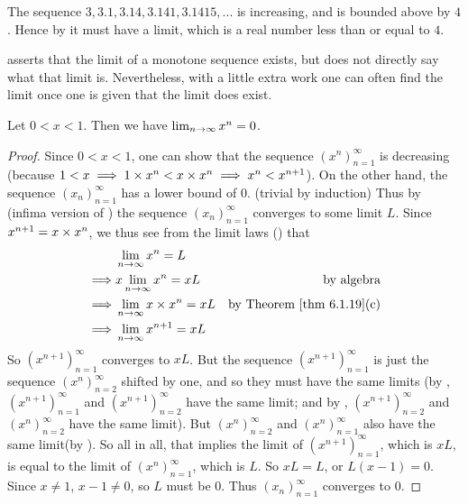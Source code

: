\begin{example} \label{example 6.3.9}
The sequence \(3, 3.1, 3.14, 3.141, 3.1415,...\) is increasing, and is bounded above by \(4\).
Hence by  it must have a limit, which is a real number less than or equal to \(4\).
\end{example}

\begin{note}
 asserts that the limit of a monotone sequence exists, but does not directly say what that limit is.
Nevertheless, with a little extra work one can often find the limit once one is given that the limit does exist.
\end{note}

\begin{proposition} \label{prop 6.3.10}
Let \(0 < x < 1\).
Then we have \(\lim_{n \to \infty} x^n = 0\).
\end{proposition}

\begin{proof}
Since \(0 < x < 1\), one can show that the sequence \((x^n)_{n = 1}^{\infty}\) is decreasing (because \(1 < x \implies 1 \times x^n < x \times x^n \implies x^n < x^{n + 1}\)).
On the other hand, the sequence \((x_n)_{n = 1}^{\infty}\) has a lower bound of 0. (trivial by induction)
Thus by  (infima version of ) the sequence \((x_n)_{n = 1}^{\infty}\) converges to some limit \(L\).
Since \(x^{n + 1} = x \times x^n\), we thus see from the limit laws () that
\begin{align*}
             & \lim_{n \toINF} x^n = L \\
    \implies & x \lim_{n \toINF} x^n = x L & \text{by algebra} \\
    \implies & \lim_{n \toINF} x \X x^n = x L & \text{by \THM{6.1.19}(c)} \\
    \implies & \lim_{n \toINF} x^{n + 1} = x L
\end{align*}
So \((x^{n + 1})_{n = 1}^{\infty}\) converges to \(xL\).
But the sequence \((x^{n + 1})_{n = 1}^{\infty}\) is just the sequence \((x^n)_{n = 2}^{\infty}\) shifted by one, and so they must have the same limits
(by , \((x^{n + 1})_{n = 1}^{\infty}\) and \((x^{n + 1})_{n = 2}^{\infty}\) have the same limit;
and by , \((x^{n + 1})_{n = 2}^{\infty}\) and \((x^n)_{n = 2}^{\infty}\) have the same limit).
But \((x^n)_{n = 2}^{\infty}\) and \((x^n)_{n = 1}^{\infty}\) also have the same limit(by ).
So all in all, that implies the limit of \((x^{n + 1})_{n = 1}^{\infty}\), which is \(xL\), is equal to the limit of \((x^n)_{n = 1}^{\infty}\), which is \(L\).
So \(xL = L\), or \(L(x - 1) = 0\).
Since \(x \neq 1\), \(x - 1 \ne 0\), so \(L\) must be \(0\).
Thus \((x_n)_{n = 1}^{\infty}\) converges to \(0\).
\end{proof}

